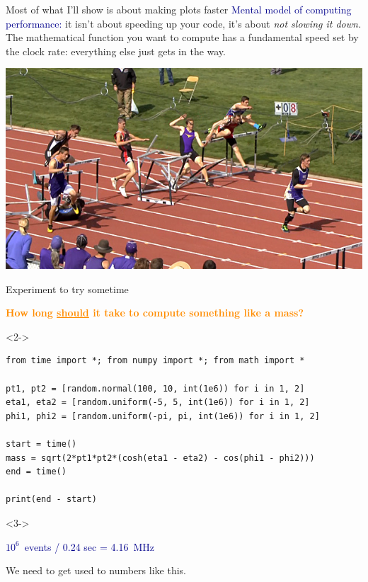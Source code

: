 \documentclass[aspectratio=169]{beamer}
\begin{document}
\begin{frame}{Most of what I'll show is about making plots faster}
\vspace{0.35 cm}
\textcolor{darkblue}{Mental model of computing performance:} it isn't about speeding up your code, it's about {\it not slowing it down.} The mathematical function you want to compute has a fundamental speed set by the clock rate: everything else just gets in the way.

\begin{center}
\includegraphics[width=0.7\linewidth]{hurdle9.jpg}
\end{center}
\end{frame}

\begin{frame}[fragile]{Experiment to try sometime}
\vspace{0.25 cm}
\begin{center}
\textcolor{darkorange}{\bf How long \underline{should} it take to compute something like a mass?}
\end{center}

\small
\begin{uncoverenv}<2->
\begin{verbatim}
from time import *; from numpy import *; from math import *

pt1, pt2 = [random.normal(100, 10, int(1e6)) for i in 1, 2]
eta1, eta2 = [random.uniform(-5, 5, int(1e6)) for i in 1, 2]
phi1, phi2 = [random.uniform(-pi, pi, int(1e6)) for i in 1, 2]

start = time()
mass = sqrt(2*pt1*pt2*(cosh(eta1 - eta2) - cos(phi1 - phi2)))
end = time()

print(end - start)
\end{verbatim}
\end{uncoverenv}

\normalsize
\vspace{-0.75 cm}\hfill\begin{minipage}{0.35\linewidth}
\begin{uncoverenv}<3->
\begin{center}
\textcolor{darkblue}{$10^6$~events / 0.24 sec = 4.16~MHz}

\vspace{0.25 cm}
We need to get used to numbers like this.
\end{center}
\end{uncoverenv}
\vspace{0.75 cm}
\end{minipage}\hspace{0.5 cm}
\end{frame}
\end{document}
